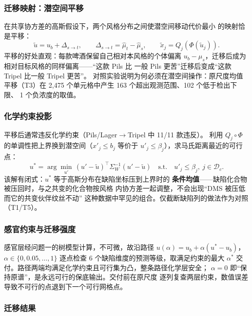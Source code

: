 \documentclass[12pt,a4paper]{article}
\begin{document}
\subsubsection{迁移映射：潜空间平移}

在共享协方差的高斯假设下，两个风格分布之间使潜空间移动代价最小
的映射恰是平移：
\begin{equation}
  \tilde u=u_b+\Delta_{s\to t},\qquad \Delta_{s\to t}=\hat\mu_t-\hat\mu_s,
  \qquad \tilde x_j=Q_j(\Phi(\tilde u_j)).
\end{equation}
平移的好处直观：每款啤酒保留自己相对本风格的个体偏离
$u_b-\mu_s$，迁移后成为相对目标风格的同样偏离——``这款 Pils 比
一般 Pils 更苦''迁移后变成``这款 Tripel 比一般 Tripel 更苦''。
对照实验说明为何必须在潜空间操作：原尺度均值平移（T3）在
2{,}475 个单元格中产生 163 个超出观测范围、102 个低于检出下限、
1 个负浓度的取值。

\subsubsection{化学约束投影}

平移后通常违反化学约束（Pils/Lager$\to$Tripel 中 11/11 款违反）。
利用 $Q_j\circ\Phi$ 的单调性把上界换到潜空间（$x'_j\le b_j$
等价于 $u'_j\le\beta_j$），求马氏距离最近的可行点：
\begin{equation}
  u^*=\arg\min_{u'}\,(u'-\tilde u)^\top\Sigma_W^{-1}(u'-\tilde u)
  \quad\text{s.t.}\quad u'_j\le\beta_j,\ j\in\mathcal D_c .
\end{equation}
该解有闭式：$u^*$ 等于高斯分布在缺陷坐标压到上界时的
\textbf{条件均值}——缺陷化合物被压回时，与之共变的化合物按风格
内协方差一起调整，不会出现``DMS 被压低而它的共变伙伴纹丝不动''
这种数据中罕见的组合。仅截断缺陷列的做法作为对照（T1/T5）。

\subsubsection{感官约束与迁移强度}

感官层经问题一的树模型计算，不可微，故沿路径
$u(\alpha)=u_b+\alpha(u^*-u_b)$，$\alpha\in\{0,0.05,\dots,1\}$
逐点检查 6 个缺陷维度的预测等级，取满足约束的最大 $\alpha^*$
交付。路径两端均满足化学约束且可行集为凸，整条路径化学层安全；
$\alpha=0$ 即``保持原谱''，是永远可行的保底输出。交付前在原尺度
逐列复查两层约束，数值误差导致不可行的点退到下一个可行网格点。

\subsubsection{迁移结果}
\end{document}
